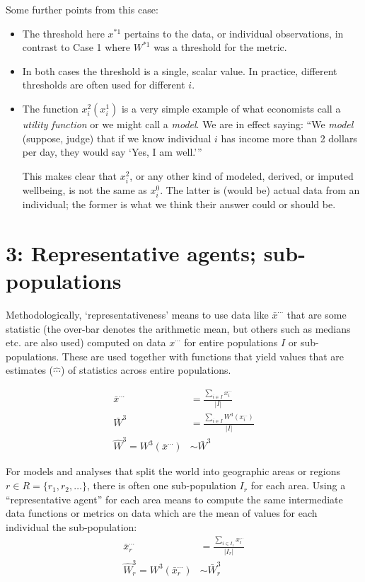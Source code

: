 \documentclass[a5paper,11pt]{article}
\begin{document}
Some further points from this case:
\begin{itemize}
  \item The threshold here $x^{\ast 1}$ pertains to the data, or individual observations, in contrast to Case 1 where $W^{\ast 1}$ was a threshold for the metric.
  \item In both cases the threshold is a single, scalar value.
    In practice, different thresholds are often used for different $i$.
  \item The function $x^2_i(x^1_i)$ is a very simple example of what economists call a \emph{utility function} or we might call a \emph{model}.
    We are in effect saying: “We \emph{model} (suppose, judge) that if we know individual $i$ has income more than 2 dollars per day, they would say ‘Yes, I am well.’”

    This makes clear that $x^2_i$, or any other kind of modeled, derived, or imputed wellbeing, is not the same as $x^0_i$.
    The latter is (would be) actual data from an individual; the former is what we think their answer could or should be.
\end{itemize}

\section{3: Representative agents; sub-populations}
Methodologically, ‘representativeness’ means to use data like $\bar{x}^{\cdots}$ that are some statistic (the over-bar denotes the arithmetic mean, but others such as medians etc. are also used) computed on data $x^{\cdots}$ for entire populations $I$ or sub-populations.
These are used together with functions that yield values that are estimates ($\hat{\cdots}$) of statistics across entire populations.

\begin{align}
                   \bar{x}^{\cdots} & = \frac{\sum_{i \in I}{x^{\cdots}_i}}{|I|} \\
                   \bar{W}^3 & = \frac{\sum_{i \in I}{W^3(x^{\cdots}_i)}}{|I|} \\
  \hat{W}^3 = W^3(\bar{x}^{\cdots}) & \sim \bar{W}^3
\end{align}

For models and analyses that split the world into geographic areas or regions $r \in R = \{r_1, r_2, \ldots\}$, there is often one sub-population $I_r$ for each area.
Using a “representative agent” for each area means to compute the same intermediate data functions or metrics on data which are the mean of values for each individual the sub-population:
\begin{align}
                       \bar{x}^{\cdots}_r & = \frac{\sum_{i \in I_r}{x^{\cdots}_i}}{|I_r|} \\
  \hat{W}^3_r = W^3(\bar{x}^{\cdots}_r) & \sim \bar{W}^3_r
\end{align}
\end{document}

